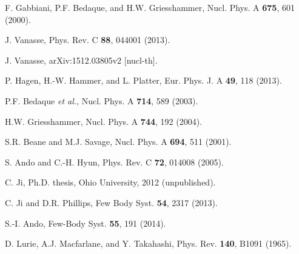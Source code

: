 \documentclass[jkps,preprint,fleqn,showpacs,showkeys]{revtex4}
\begin{document}
\begin{references}
F. Gabbiani, P.F. Bedaque, and H.W. Griesshammer,
Nucl. Phys. A {\bf 675}, 601 (2000).

J. Vanasse,
Phys. Rev. C {\bf 88}, 044001 (2013).

J. Vanasse,
arXiv:1512.03805v2 [nucl-th].

P. Hagen, H.-W. Hammer, and L. Platter,
Eur. Phys. J. A {\bf 49}, 118 (2013).

P.F. Bedaque {\it et al.},
Nucl. Phys. A {\bf 714}, 589 (2003).

H.W. Griesshammer,
Nucl. Phys. A {\bf 744}, 192 (2004).

S.R. Beane and M.J. Savage,
Nucl. Phys. A {\bf 694}, 511 (2001).

S. Ando and C.-H. Hyun,
Phys. Rev. C {\bf 72}, 014008 (2005).

C. Ji, Ph.D. thesis, Ohio University, 2012 (unpublished).

C. Ji and D.R. Phillips,
Few Body Syst. {\bf 54}, 2317 (2013).

S.-I. Ando,
Few-Body Syst. {\bf 55}, 191 (2014).

D. Lurie, A.J. Macfarlane, and Y. Takahashi,
Phys. Rev. {\bf 140}, B1091 (1965).

\end{references}
\end{document}
